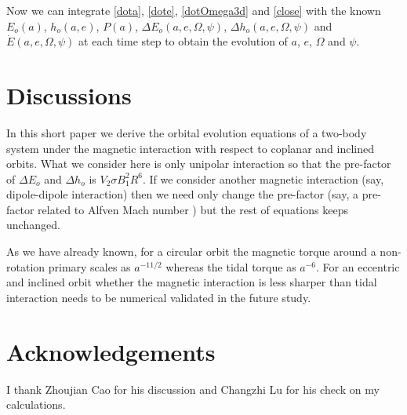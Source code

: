 \documentclass[twocolumn,linenumbers]{aastex631}
\begin{document}
Now we can integrate \eqref{dota}, \eqref{dote}, \eqref{dotOmega3d} and \eqref{close} with the known $E_o(a)$, $h_o(a,e)$, $P(a)$, $\Delta E_o(a,e,\Omega,\psi)$, $\Delta h_o(a,e,\Omega,\psi)$ and $\dot E(a,e,\Omega,\psi)$ at each time step to obtain the evolution of $a$, $e$, $\Omega$ and $\psi$.

\section{Discussions}

In this short paper we derive the orbital evolution equations of a two-body system under the magnetic interaction with respect to coplanar and inclined orbits. What we consider here is only unipolar interaction so that the pre-factor of $\Delta E_o$ and $\Delta h_o$ is $V_2\sigma B_1^2 R^6$. If we consider another magnetic interaction (say, dipole-dipole interaction) then we need only change the pre-factor (say, a pre-factor related to Alfven Mach number \citep{zarka2007, li2025}) but the rest of equations keeps unchanged.

As we have already known, for a circular orbit the magnetic torque around a non-rotation primary scales as $a^{-11/2}$ whereas the tidal torque as $a^{-6}$. For an eccentric and inclined orbit whether the magnetic interaction is less sharper than tidal interaction needs to be numerical validated in the future study.

\section*{Acknowledgements}
I thank Zhoujian Cao for his discussion and Changzhi Lu for his check on my calculations.

{}

\end{document}
